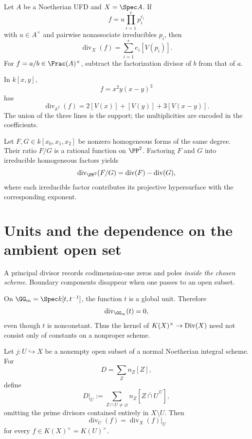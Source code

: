 \begin{proposition}\label{prop:vi39-ufd-divisor}
Let \(A\) be a Noetherian UFD and \(X=\Spec A\).  If
\[
 f=u\prod_{i=1}^r p_i^{e_i}
\]
with \(u\in A^\times\) and pairwise nonassociate irreducibles \(p_i\), then
\[
 \operatorname{div}_X(f)=\sum_{i=1}^r e_i[V(p_i)].
\]
For \(f=a/b\in\Frac(A)^\times\), subtract the factorization divisor of \(b\) from that of \(a\).
\end{proposition}

\begin{example}\label{ex:vi39-a2-factorization}
In \(k[x,y]\),
\[
 f=x^2y(x-y)^3
\]
has
\[
 \operatorname{div}_{\mathbb{A}^2}(f)
 =2[V(x)]+[V(y)]+3[V(x-y)].
\]
The union of the three lines is the support; the multiplicities are encoded in the coefficients.
\end{example}

\begin{example}\label{ex:vi39-p2-ratio}
Let \(F,G\in k[x_0,x_1,x_2]\) be nonzero homogeneous forms of the same degree.  Their ratio \(F/G\) is a rational function on \(\PP^2\).  Factoring \(F\) and \(G\) into irreducible homogeneous factors yields
\[
 \operatorname{div}_{\PP^2}(F/G)=\operatorname{div}(F)-\operatorname{div}(G),
\]
where each irreducible factor contributes its projective hypersurface with the corresponding exponent.
\end{example}

\section{Units and the dependence on the ambient open set}
A principal divisor records codimension-one zeros and poles \emph{inside the chosen scheme}.  Boundary components disappear when one passes to an open subset.

\begin{example}\label{ex:vi39-gm-unit}
On \(\GG_m=\Spec k[t,t^{-1}]\), the function \(t\) is a global unit.  Therefore
\[
 \operatorname{div}_{\GG_m}(t)=0,
\]
even though \(t\) is nonconstant.  Thus the kernel of \(K(X)^\times\to\operatorname{Div}(X)\) need not consist only of constants on a nonproper scheme.
\end{example}

\begin{proposition}\label{prop:vi39-restriction}
Let \(j:U\hookrightarrow X\) be a nonempty open subset of a normal Noetherian integral scheme.  For
\[
 D=\sum_Z n_Z[Z],
\]
define
\[
 D|_U:=\sum_{Z\cap U\ne\varnothing}n_Z[\overline{Z\cap U}^{\,U}],
\]
omitting the prime divisors contained entirely in \(X\setminus U\).  Then
\[
 \operatorname{div}_U(f)=\operatorname{div}_X(f)|_U
\]
for every \(f\in K(X)^\times=K(U)^\times\).
\end{proposition}

